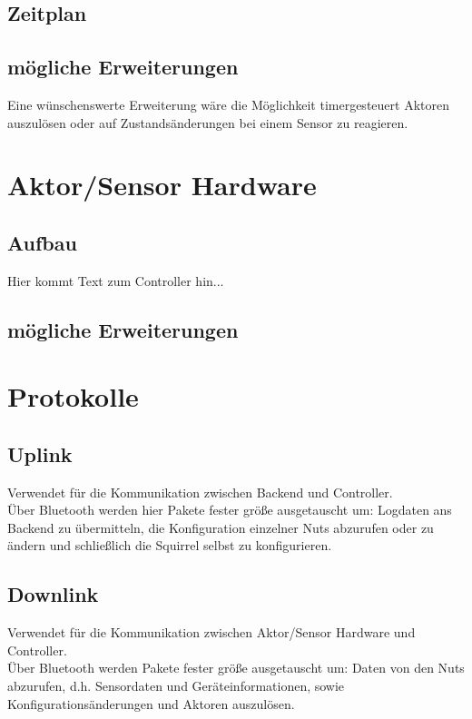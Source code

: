 \documentclass[12pt,a4paper]{article}
\begin{document}
\subsection{Zeitplan}





\subsection{mögliche Erweiterungen}
Eine wünschenswerte Erweiterung wäre die Möglichkeit timergesteuert Aktoren auszulösen oder auf Zustandsänderungen bei einem Sensor zu reagieren.





\section{Aktor/Sensor Hardware}

\subsection{Aufbau}


Hier kommt Text zum Controller hin...

\subsection{mögliche Erweiterungen}


\section{Protokolle}

\subsection{Uplink}

Verwendet für die Kommunikation zwischen Backend und Controller.\\
Über Bluetooth werden hier Pakete fester größe ausgetauscht um: Logdaten ans Backend zu übermitteln, die Konfiguration einzelner Nuts abzurufen oder zu ändern und schließlich die Squirrel selbst zu konfigurieren.

\subsection{Downlink}

Verwendet für die Kommunikation zwischen Aktor/Sensor Hardware und Controller.\\
Über Bluetooth werden Pakete fester größe ausgetauscht um: Daten von den Nuts abzurufen, d.h. Sensordaten und Geräteinformationen, sowie Konfigurationsänderungen und Aktoren auszulösen. 
\end{document}
